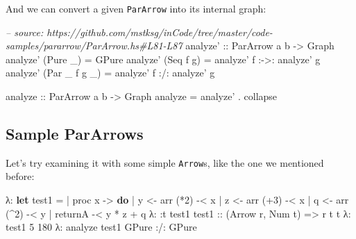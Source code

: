 \documentclass[]{article}
\newenvironment{Shaded}{\begin{snugshade}}{\end{snugshade}}
\newcommand{\CommentTok}[1]{\textcolor[rgb]{0.56,0.35,0.01}{\textit{#1}}}
\newcommand{\DataTypeTok}[1]{\textcolor[rgb]{0.13,0.29,0.53}{#1}}
\newcommand{\DecValTok}[1]{\textcolor[rgb]{0.00,0.00,0.81}{#1}}
\newcommand{\FunctionTok}[1]{\textcolor[rgb]{0.00,0.00,0.00}{#1}}
\newcommand{\KeywordTok}[1]{\textcolor[rgb]{0.13,0.29,0.53}{\textbf{#1}}}
\newcommand{\NormalTok}[1]{#1}
\newcommand{\OtherTok}[1]{\textcolor[rgb]{0.56,0.35,0.01}{#1}}
\begin{document}
And we can convert a given \texttt{ParArrow} into its internal graph:

\begin{Shaded}
\begin{Highlighting}[]
\CommentTok{-- source: https://github.com/mstksg/inCode/tree/master/code-samples/pararrow/ParArrow.hs#L81-L87}
\OtherTok{analyze' ::} \DataTypeTok{ParArrow}\NormalTok{ a b }\OtherTok{->} \DataTypeTok{Graph}
\NormalTok{analyze' (}\DataTypeTok{Pure}\NormalTok{ _) }\FunctionTok{=} \DataTypeTok{GPure}
\NormalTok{analyze' (}\DataTypeTok{Seq}\NormalTok{ f g) }\FunctionTok{=}\NormalTok{ analyze' f }\FunctionTok{:->:}\NormalTok{ analyze' g}
\NormalTok{analyze' (}\DataTypeTok{Par}\NormalTok{ _ f g _) }\FunctionTok{=}\NormalTok{ analyze' f }\FunctionTok{:/:}\NormalTok{ analyze' g}

\OtherTok{analyze ::} \DataTypeTok{ParArrow}\NormalTok{ a b }\OtherTok{->} \DataTypeTok{Graph}
\NormalTok{analyze }\FunctionTok{=}\NormalTok{ analyze' }\FunctionTok{.}\NormalTok{ collapse}
\end{Highlighting}
\end{Shaded}

\hypertarget{sample-pararrows}{%
\subsection{Sample ParArrows}\label{sample-pararrows}}

Let's try examining it with some simple \texttt{Arrow}s, like the one we
mentioned before:

\begin{Shaded}
\begin{Highlighting}[]
\NormalTok{λ}\FunctionTok{:} \KeywordTok{let}\NormalTok{ test1 }\FunctionTok{=}
 \FunctionTok{|}\NormalTok{       proc x }\OtherTok{->} \KeywordTok{do}
 \FunctionTok{|}\NormalTok{       y }\OtherTok{<-}\NormalTok{ arr (}\FunctionTok{*}\DecValTok{2}\NormalTok{) }\FunctionTok{-<}\NormalTok{ x}
 \FunctionTok{|}\NormalTok{       z }\OtherTok{<-}\NormalTok{ arr (}\FunctionTok{+}\DecValTok{3}\NormalTok{) }\FunctionTok{-<}\NormalTok{ x}
 \FunctionTok{|}\NormalTok{       q }\OtherTok{<-}\NormalTok{ arr (}\FunctionTok{^}\DecValTok{2}\NormalTok{) }\FunctionTok{-<}\NormalTok{ y}
 \FunctionTok{|}\NormalTok{       returnA }\FunctionTok{-<}\NormalTok{ y }\FunctionTok{*}\NormalTok{ z }\FunctionTok{+}\NormalTok{ q}
\NormalTok{λ}\FunctionTok{:} \FunctionTok{:}\NormalTok{t test1}
\OtherTok{test1 ::}\NormalTok{ (}\DataTypeTok{Arrow}\NormalTok{ r, }\DataTypeTok{Num}\NormalTok{ t) }\OtherTok{=>}\NormalTok{ r t t}
\NormalTok{λ}\FunctionTok{:}\NormalTok{ test1 }\DecValTok{5}
\DecValTok{180}
\NormalTok{λ}\FunctionTok{:}\NormalTok{ analyze test1}
\DataTypeTok{GPure} \FunctionTok{:/:} \DataTypeTok{GPure}
\end{Highlighting}
\end{Shaded}
\end{document}
